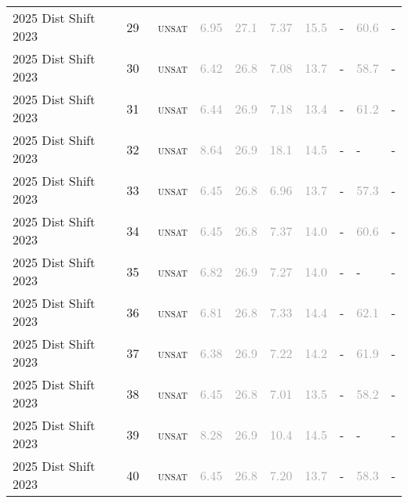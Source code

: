 \begin{center}
{\begin{longtable}{@{}llllllllll@{}}
2025 Dist Shift 2023 & 29 & ~\textsc{unsat} & \textcolor{darkgray}{6.95} & \textcolor{darkgray}{27.1} & \textcolor{darkgray}{7.37} & \textcolor{darkgray}{15.5} & - & \textcolor{darkgray}{60.6} & - \\
2025 Dist Shift 2023 & 30 & ~\textsc{unsat} & \textcolor{darkgray}{6.42} & \textcolor{darkgray}{26.8} & \textcolor{darkgray}{7.08} & \textcolor{darkgray}{13.7} & - & \textcolor{darkgray}{58.7} & - \\
2025 Dist Shift 2023 & 31 & ~\textsc{unsat} & \textcolor{darkgray}{6.44} & \textcolor{darkgray}{26.9} & \textcolor{darkgray}{7.18} & \textcolor{darkgray}{13.4} & - & \textcolor{darkgray}{61.2} & - \\
2025 Dist Shift 2023 & 32 & ~\textsc{unsat} & \textcolor{darkgray}{8.64} & \textcolor{darkgray}{26.9} & \textcolor{darkgray}{18.1} & \textcolor{darkgray}{14.5} & - & - & - \\
2025 Dist Shift 2023 & 33 & ~\textsc{unsat} & \textcolor{darkgray}{6.45} & \textcolor{darkgray}{26.8} & \textcolor{darkgray}{6.96} & \textcolor{darkgray}{13.7} & - & \textcolor{darkgray}{57.3} & - \\
2025 Dist Shift 2023 & 34 & ~\textsc{unsat} & \textcolor{darkgray}{6.45} & \textcolor{darkgray}{26.8} & \textcolor{darkgray}{7.37} & \textcolor{darkgray}{14.0} & - & \textcolor{darkgray}{60.6} & - \\
2025 Dist Shift 2023 & 35 & ~\textsc{unsat} & \textcolor{darkgray}{6.82} & \textcolor{darkgray}{26.9} & \textcolor{darkgray}{7.27} & \textcolor{darkgray}{14.0} & - & - & - \\
2025 Dist Shift 2023 & 36 & ~\textsc{unsat} & \textcolor{darkgray}{6.81} & \textcolor{darkgray}{26.8} & \textcolor{darkgray}{7.33} & \textcolor{darkgray}{14.4} & - & \textcolor{darkgray}{62.1} & - \\
2025 Dist Shift 2023 & 37 & ~\textsc{unsat} & \textcolor{darkgray}{6.38} & \textcolor{darkgray}{26.9} & \textcolor{darkgray}{7.22} & \textcolor{darkgray}{14.2} & - & \textcolor{darkgray}{61.9} & - \\
2025 Dist Shift 2023 & 38 & ~\textsc{unsat} & \textcolor{darkgray}{6.45} & \textcolor{darkgray}{26.8} & \textcolor{darkgray}{7.01} & \textcolor{darkgray}{13.5} & - & \textcolor{darkgray}{58.2} & - \\
2025 Dist Shift 2023 & 39 & ~\textsc{unsat} & \textcolor{darkgray}{8.28} & \textcolor{darkgray}{26.9} & \textcolor{darkgray}{10.4} & \textcolor{darkgray}{14.5} & - & - & - \\
2025 Dist Shift 2023 & 40 & ~\textsc{unsat} & \textcolor{darkgray}{6.45} & \textcolor{darkgray}{26.8} & \textcolor{darkgray}{7.20} & \textcolor{darkgray}{13.7} & - & \textcolor{darkgray}{58.3} & - \\

\end{longtable}}
\end{center}
